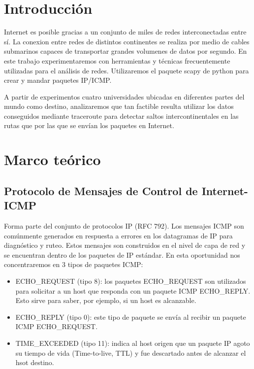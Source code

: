 \section{Introducción}

Internet es posible gracias a un conjunto de miles de redes interconectadas entre sí.
La conexion entre redes de distintos continentes se realiza por medio de cables submarinos capaces de transportar grandes volumenes de datos por segundo.
En este trabajo experimentaremos con herramientas y técnicas frecuentemente utilizadas para el análisis de redes.
Utilizaremos el paquete scapy de python para crear y mandar paquetes IP/ICMP. 

A partir de experimentos cuatro universidades ubicadas en diferentes partes del mundo como destino, analizaremos que tan factible resulta utilizar los datos conseguidos mediante traceroute para detectar saltos intercontinentales en las rutas que por las que se envían los paquetes en Internet.  




\section{Marco teórico}

\subsection{Protocolo de Mensajes de Control de Internet- ICMP}

Forma parte del conjunto de protocolos IP (RFC 792). 
Los mensajes ICMP son comúnmente generados en respuesta a errores en los datagramas de IP para diagnóstico y ruteo. Estos mensajes son construidos en el nivel de capa de red y se encuentran dentro de los paquetes de IP estándar.
En esta oportunidad nos concentraremos en 3 tipos de paquetes ICMP:
\begin{itemize}
 \item ECHO\_REQUEST (tipo 8): los paquetes ECHO\_REQUEST son utilizados para solicitar a un host que responda con un paquete ICMP ECHO\_REPLY. Esto sirve para saber, por ejemplo, si un host es alcanzable.
 \item ECHO\_REPLY (tipo 0): este tipo de paquete se envía al recibir un paquete ICMP ECHO\_REQUEST.
 \item TIME\_EXCEEDED (tipo 11): indica al host origen que un paquete IP agoto su tiempo de vida (Time-to-live, TTL) y fue descartado antes de alcanzar el hsot destino.
\end{itemize}


